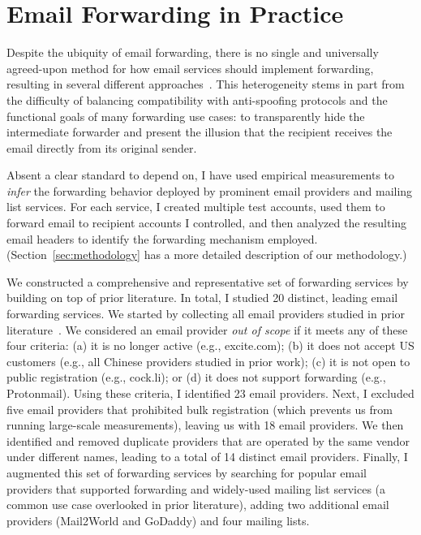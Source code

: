 \section{Email Forwarding in Practice}
\label{sec:measure_forwarding_mechs_and_arc}

Despite the ubiquity of email forwarding, there is no single and
universally agreed-upon method for how email services should implement
forwarding, resulting in several different approaches~\cite{Emailfor34:online}.  This
heterogeneity stems in part from the difficulty of balancing
compatibility with anti-spoofing protocols and the functional goals of
many forwarding use cases: to transparently hide the intermediate
forwarder and present the illusion that the recipient receives the
email directly from its original sender.

Absent a clear standard to depend on, I have used empirical
measurements to \emph{infer} the forwarding behavior deployed by
prominent email providers and mailing list services.  For each
service, I created multiple test accounts, used them to forward email
to recipient accounts I controlled, and then analyzed the resulting
email headers to identify the forwarding mechanism employed.
(Section~\ref{sec:methodology} has a more detailed description of our
methodology.)

We constructed a comprehensive and representative set of forwarding services by building on top of prior literature.
In total, I studied 20 distinct, leading email forwarding services.
We started by collecting all email providers studied in prior literature~\cite{chen2020composition,shen2020weak,hu_end--end_nodate,wang2022revisiting}.
We considered an email provider \emph{out of scope} if it meets any of these four criteria: (a) it is no longer active (e.g., excite.com); (b) it does not accept US customers (e.g., all Chinese providers studied in prior work);  (c) it is not open to public registration (e.g., cock.li); or (d) it does not support forwarding (e.g., Protonmail).
Using these criteria, I identified 23 email providers.
Next, I excluded five email providers that prohibited bulk registration (which prevents us from running large-scale measurements), leaving us with 18 email providers.
We then identified and removed duplicate providers that are operated by the same vendor under different names, leading to a total of 14 distinct email providers.
Finally, I augmented this set of forwarding services by searching for popular email providers that supported forwarding and widely-used mailing list services (a common use case overlooked in prior literature), adding two additional email providers (Mail2World and GoDaddy) and four mailing lists.

